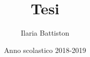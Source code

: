 \documentclass{report}
\title{Tesi}
\author{Ilaria Battiston}
\date{Anno scolastico 2018-2019}
\begin{document}
\maketitle

\lfoot{}
\cfoot{}
\rfoot{\thepage}

\newpage
\tableofcontents
\newpage
 
\end{document}

